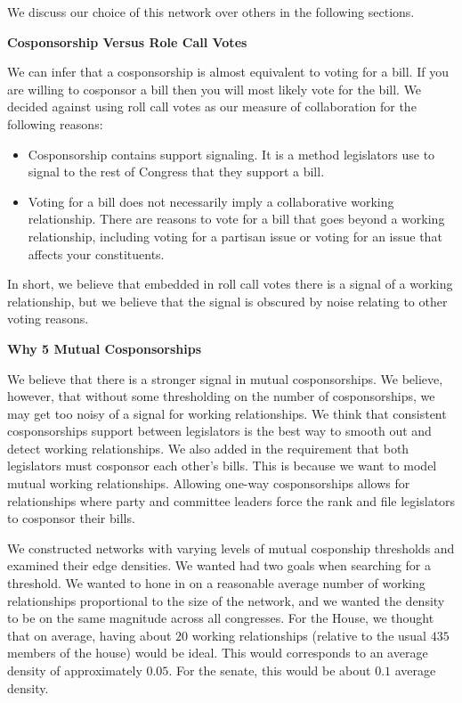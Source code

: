 We discuss our choice of this network over others in the following sections.

\vspace{3mm}

\noindent
\textbf{Cosponsorship Versus Role Call Votes}

\vspace{3mm}

We can infer that a cosponsorship is almost equivalent to voting for a bill. If 
you are willing to cosponsor a bill then you will most likely vote for the bill. 
We decided against using roll call votes as our measure of collaboration for 
the following reasons:

\begin{itemize}
	\item Cosponsorship contains support signaling. It is a method legislators 
	use to signal to the rest of Congress that they support a bill.
	\item Voting for a bill does not necessarily imply a collaborative working 
	relationship. There are reasons to vote for a bill that goes beyond a 
	working relationship, including voting for a partisan issue or voting for 
	an issue that affects your constituents.
\end{itemize}

In short, we believe that embedded in roll call votes there is a signal of a 
working relationship, but we believe that the signal is obscured by noise 
relating to other voting reasons.

\vspace{3mm}

\noindent
\textbf{Why 5 Mutual Cosponsorships}

\vspace{3mm}

We believe that there is a stronger signal in mutual cosponsorships. We believe, 
however, that without some thresholding on the number of cosponsorships, we may 
get too noisy of a signal for working relationships. We think that consistent 
cosponsorships support between legislators is the best way to smooth out and 
detect working relationships. We also added in the requirement that both 
legislators must cosponsor each other's bills. This is because we want to model 
mutual working relationships. Allowing one-way cosponsorships allows for 
relationships where party and committee leaders force the rank and file 
legislators to cosponsor their bills.

We constructed networks with varying levels of mutual cosponship thresholds and
examined their edge densities. We wanted had two goals when searching for a
threshold. We wanted to hone in on a reasonable average number of working
relationships proportional to the size of the network, and we wanted the density
to be on the same magnitude across all congresses. For the House, we thought 
that on average, having about $20$ working relationships (relative to the usual 
$435$ members of the house) would be ideal. This would corresponds to an average 
density of approximately $0.05$. For the senate, this would be about $0.1$ 
average density.

